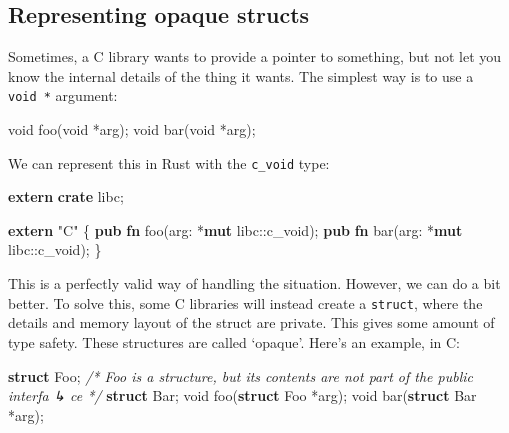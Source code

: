 \documentclass[a4paper,]{book}
\newenvironment{Shaded}{\begin{snugshade}}{\end{snugshade}}
\newcommand{\KeywordTok}[1]{\textcolor[rgb]{0.13,0.29,0.53}{\textbf{{#1}}}}
\newcommand{\DataTypeTok}[1]{\textcolor[rgb]{0.13,0.29,0.53}{{#1}}}
\newcommand{\StringTok}[1]{\textcolor[rgb]{0.31,0.60,0.02}{{#1}}}
\newcommand{\CommentTok}[1]{\textcolor[rgb]{0.56,0.35,0.01}{\textit{{#1}}}}
\newcommand{\NormalTok}[1]{{#1}}
\begin{document}
\subsection{Representing opaque
structs}\label{representing-opaque-structs}

Sometimes, a C library wants to provide a pointer to something, but not
let you know the internal details of the thing it wants. The simplest
way is to use a \texttt{void\ *} argument:

\begin{Shaded}
\begin{Highlighting}[]
\DataTypeTok{void} \NormalTok{foo(}\DataTypeTok{void} \NormalTok{*arg);}
\DataTypeTok{void} \NormalTok{bar(}\DataTypeTok{void} \NormalTok{*arg);}
\end{Highlighting}
\end{Shaded}

We can represent this in Rust with the \texttt{c\_void} type:

\begin{Shaded}
\begin{Highlighting}[]
\KeywordTok{extern} \KeywordTok{crate} \NormalTok{libc;}

\KeywordTok{extern} \StringTok{"C"} \NormalTok{\{}
    \KeywordTok{pub} \KeywordTok{fn} \NormalTok{foo(arg: *}\KeywordTok{mut} \NormalTok{libc::}\DataTypeTok{c_void}\NormalTok{);}
    \KeywordTok{pub} \KeywordTok{fn} \NormalTok{bar(arg: *}\KeywordTok{mut} \NormalTok{libc::}\DataTypeTok{c_void}\NormalTok{);}
\NormalTok{\}}
\end{Highlighting}
\end{Shaded}

This is a perfectly valid way of handling the situation. However, we can
do a bit better. To solve this, some C libraries will instead create a
\texttt{struct}, where the details and memory layout of the struct are
private. This gives some amount of type safety. These structures are
called `opaque'. Here's an example, in C:

\begin{Shaded}
\begin{Highlighting}[]
\KeywordTok{struct} \NormalTok{Foo; }\CommentTok{/* Foo is a structure, but its contents are not part of the public interfa}
\CommentTok{↳ ce */}
\KeywordTok{struct} \NormalTok{Bar;}
\DataTypeTok{void} \NormalTok{foo(}\KeywordTok{struct} \NormalTok{Foo *arg);}
\DataTypeTok{void} \NormalTok{bar(}\KeywordTok{struct} \NormalTok{Bar *arg);}
\end{Highlighting}
\end{Shaded}
\end{document}
